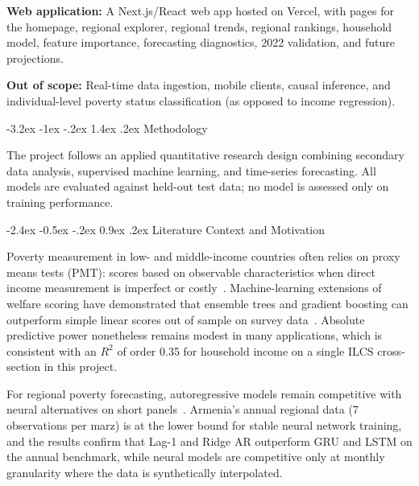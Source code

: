 \documentclass[12pt]{article}
\makeatletter
\renewcommand\section{%
  \@startsection{section}{1}{\z@}%
    {-3.2ex \@plus -1ex \@minus -.2ex}%
    {1.4ex \@plus .2ex}%
    {\color{navyblue}\large\bfseries}}
\renewcommand\subsection{%
  \@startsection{subsection}{2}{\z@}%
    {-2.4ex \@plus -0.5ex \@minus -.2ex}%
    {0.9ex \@plus .2ex}%
    {\color{steelblue}\normalsize\bfseries}}
\let\oldsection\section
\renewcommand{\section}[1]{%
  \oldsection{#1}%
  \noindent{\color{rulecolor}\rule{\linewidth}{0.5pt}}\par\vspace{0.3ex}%
}
\makeatother
\begin{document}
\vspace{0.3em}
\noindent\textbf{Web application:}
A Next.js/React web app hosted on Vercel, with pages for the homepage,
regional explorer, regional trends, regional rankings, household model,
feature importance, forecasting diagnostics, 2022 validation, and future
projections.

\vspace{0.3em}
\noindent\textbf{Out of scope:}
Real-time data ingestion, mobile clients, causal inference, and individual-level
poverty status classification (as opposed to income regression).

\newpage

\section{Methodology}

\indent\hspace*{1em}
The project follows an applied quantitative research design combining secondary
data analysis, supervised machine learning, and time-series forecasting. All
models are evaluated against held-out test data; no model is assessed only on
training performance.

\subsection{Literature Context and Motivation}

\indent\hspace*{1em}
Poverty measurement in low- and middle-income countries often relies on proxy
means tests (PMT): scores based on observable characteristics when direct income
measurement is imperfect or costly~\cite{wb2015pmt}.
Machine-learning extensions of welfare scoring have demonstrated that ensemble
trees and gradient boosting can outperform simple linear scores out of sample
on survey data~\cite{mcbride2018}. Absolute predictive power nonetheless remains
modest in many applications, which is consistent with an $R^2$ of order 0.35 for
household income on a single ILCS cross-section in this project.

For regional poverty forecasting, autoregressive models remain competitive with
neural alternatives on short panels~\cite{athey2019ml}. Armenia's annual regional
data (7 observations per marz) is at the lower bound for stable neural network
training, and the results confirm that Lag-1 and Ridge AR outperform GRU and
LSTM on the annual benchmark, while neural models are competitive only at monthly
granularity where the data is synthetically interpolated.
\end{document}
